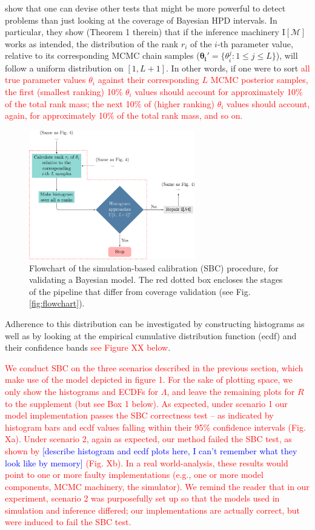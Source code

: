 \documentclass[oneside]{article}
\begin{document}
\cite{Talts2018} show that one can devise other tests that might be more powerful to detect problems than just looking at the coverage of Bayesian HPD intervals.
In particular, they show (Theorem 1 therein) that if the inference machinery $\text{I}[\mathcal{M}]$ works as intended, the distribution of the rank $r_i$ of the $i$-th parameter value, relative to its corresponding MCMC chain samples ($\boldsymbol{\theta_i'} = \{\theta_i^j: 1 \leq j \leq L\}$), will follow a uniform distribution on $[1, L + 1]$.
In other words, if one were to sort \textcolor{red}{all true parameter values $\theta_i$ against their corresponding $L$ MCMC posterior samples, the first (smallest ranking) 10\% $\theta_i$ values should account for approximately 10\% of the total rank mass; the next 10\% of (higher ranking) $\theta_i$ values should account, again, for approximately 10\% of the total rank mass, and so on.}
\begin{figure}
  \includegraphics[width=7.25cm]{../figures/flowchart_sbc.pdf}
  \caption{Flowchart of the simulation-based calibration (SBC) procedure,
    for validating a Bayesian model. The red dotted box encloses the stages of the pipeline that
  differ from coverage validation (see Fig. \ref{fig:flowchart}).}
\label{fig:sbcflowchart}
\end{figure}
Adherence to this distribution can be investigated by constructing histograms \citep{Talts2018} as well as by looking at the empirical cumulative distribution function (ecdf) and their confidence bands \citep{Sailynoja2021} \textcolor{red}{see Figure XX below}.

\textcolor{red}{We conduct SBC on the three scenarios described in the previous section, which make use of the model depicted in figure 1.
For the sake of plotting space, we only show the histograms and ECDFs for $\Lambda$, and leave the remaining plots for $R$ to the supplement (but see Box 1 below).
As expected, under scenario 1 our model implementation passes the SBC correctness test -- as indicated by histogram bars and ecdf values falling within their 95\% confidence intervals (Fig. Xa).
Under scenario 2, again as expected, our method failed the SBC test, as shown by \textcolor{blue}{[describe histogram and ecdf plots here, I can't remember what they look like by memory]} (Fig. Xb).
In a real world-analysis, these results would point to one or more faulty implementations (e.g., one or more model components, MCMC machinery, the simulator).
We remind the reader that in our experiment, scenario 2 was purposefully set up so that the models used in simulation and inference differed; our implementations are actually correct, but were induced to fail the SBC test.}
\end{document}
